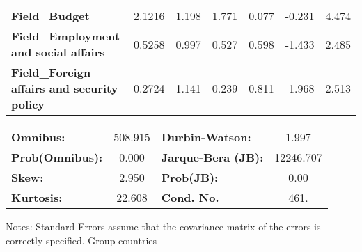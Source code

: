 \documentclass[ 11pt]{article}
\begin{document}
\begin{center}
\begin{longtable}{lcccccc}
\textbf{Field\_Budget}                                     &       2.1216  &        1.198     &     1.771  &         0.077        &       -0.231    &        4.474     \\
\textbf{Field\_Employment and social affairs}              &       0.5258  &        0.997     &     0.527  &         0.598        &       -1.433    &        2.485     \\
\textbf{Field\_Foreign affairs and security policy}        &       0.2724  &        1.141     &     0.239  &         0.811        &       -1.968    &        2.513     \\
\bottomrule
\end{longtable}
\begin{tabular}{lclc}
\textbf{Omnibus:}       & 508.915 & \textbf{  Durbin-Watson:     } &     1.997  \\
\textbf{Prob(Omnibus):} &   0.000 & \textbf{  Jarque-Bera (JB):  } & 12246.707  \\
\textbf{Skew:}          &   2.950 & \textbf{  Prob(JB):          } &      0.00  \\
\textbf{Kurtosis:}      &  22.608 & \textbf{  Cond. No.          } &      461.  \\
\bottomrule
\end{tabular}
\end{center}

Notes: \newline
 [1] Standard Errors assume that the covariance matrix of the errors is correctly specified.
 \newpage
 Group countries 
\end{document}
